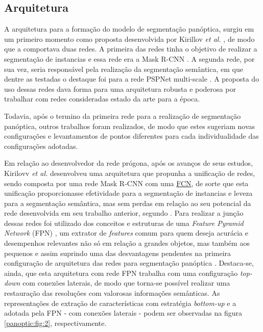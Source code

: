 \subsection{Arquitetura}
A arquitetura para a formação do modelo de segmentação panóptica, surgiu em um primeiro momento como proposta desenvolvida por Kirillov \textit{et al.} \cite{Kirillov2019a}, de modo que a comportava duas redes. A primeira das redes tinha o objetivo de realizar a segmentação de instancias e essa rede era a Mask R-CNN \cite{He2020}. A segunda rede, por sua vez, seria responsável pela realização da segmentação semântica, em que dentre as testadas o destaque foi para a rede PSPNet multi-scale \cite{Zhao2017}. A proposta do uso dessas redes dava forma para uma arquitetura robusta e poderosa \cite{Kirillov2019a} por trabalhar com redes consideradas estado da arte para a época.

Todavia, após o termino da primeira rede para a realização de segmentação panóptica, outros trabalhos foram realizados, de modo que estes sugeriam novas configurações e levantamentos de pontos diferentes para cada individualidade das configurações adotadas.

Em relação ao desenvolvedor da rede prógona, após os avanços de seus estudos, Kirilovv \textit{et al.} \cite{Kirillov2019} desenvolveu uma arquitetura que propunha a unificação de redes, sendo composta por uma rede Mask R-CNN com uma \hyperref[semantic:FCN]{FCN}, de sorte que esta unificação proporcionasse efetividade para a segmentação de instancias e leveza para a segmentação semântica, mas sem perdas em relação ao seu potencial da rede desenvolvida em seu trabalho anterior, segundo \cite{Kirillov2019}. Para realizar a junção dessas redes foi utilizado dos conceitos e estruturas de uma \textit{Feature Pyramid Network} (FPN) \cite{Lin2016}, um extrator de \textit{features} comum para quem deseja acurácia e desempenhos relevantes não só em relação a grandes objetos, mas também aos pequenos \cite{Lin2016} e assim suprindo uma das desvantagens pendentes na primeira configuração de arquitetura das redes para segmentação panóptica \cite{Kirillov2019, Kirillov2019a}. Destaca-se, ainda, que esta arquitetura com rede FPN trabalha com uma configuração \textit{top-down} com conexões laterais, de modo que torna-se possível realizar uma restauração das resoluções com valorosas informações semânticas. As representações de extração de características com estratégia \textit{bottom-up} e a adotada pela FPN - com conexões laterais - podem ser observadas na figura \ref{panoptic:fig:2}, respectivamente.

